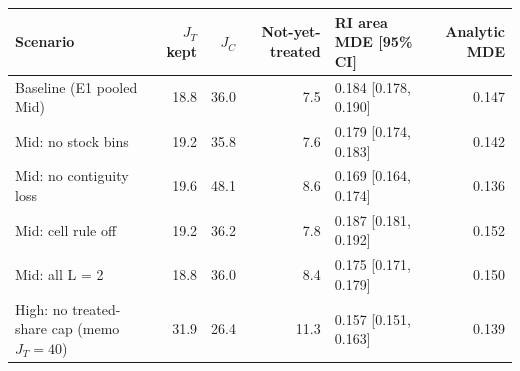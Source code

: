 \begin{tabular}{lrrrlr}
\toprule
Scenario & $J_T$ kept & $J_C$ & Not-yet-treated & RI area MDE [95\% CI] & Analytic MDE \\
\midrule
Baseline (E1 pooled Mid) & 18.8 & 36.0 & 7.5 & 0.184 [0.178, 0.190] & 0.147 \\
Mid: no stock bins & 19.2 & 35.8 & 7.6 & 0.179 [0.174, 0.183] & 0.142 \\
Mid: no contiguity loss & 19.6 & 48.1 & 8.6 & 0.169 [0.164, 0.174] & 0.136 \\
Mid: cell rule off & 19.2 & 36.2 & 7.8 & 0.187 [0.181, 0.192] & 0.152 \\
Mid: all L = 2 & 18.8 & 36.0 & 8.4 & 0.175 [0.171, 0.179] & 0.150 \\
High: no treated-share cap (memo $J_T = 40$) & 31.9 & 26.4 & 11.3 & 0.157 [0.151, 0.163] & 0.139 \\
\bottomrule
\end{tabular}
